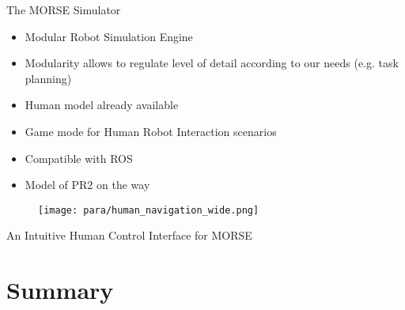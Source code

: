 \documentclass{beamer}
\begin{document}
\begin{frame}{The MORSE Simulator}
\begin{itemize}
\item Modular Robot Simulation Engine
\item Modularity allows to regulate level of detail according to our needs (e.g. task planning)
\item Human model already available
\item Game mode for Human Robot Interaction scenarios
\item Compatible with ROS
\item Model of PR2 on the way
\end{itemize}
 \begin{figure}[h]
    \texttt{[image: para/human\_navigation\_wide.png]} 
  \end{figure}

\end{frame}

\begin{frame}{An Intuitive Human Control Interface for MORSE}
 \begin{center}
 \end{center}
\end{frame}

\section{Summary}
\end{document}
